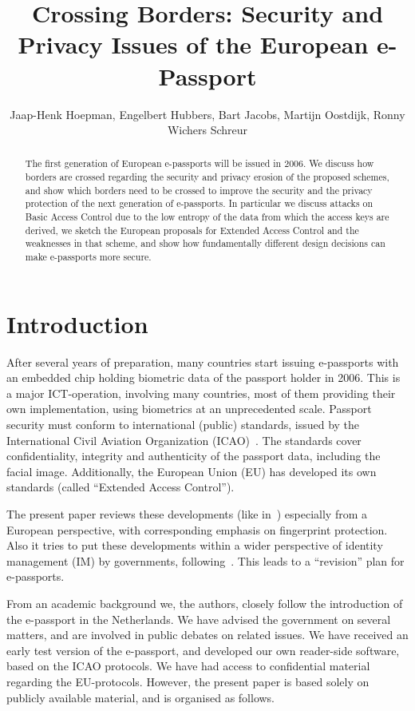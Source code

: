 \documentclass[runningheads,envcountsame,envcountsect,oribibl]{llncs}
\title{Crossing Borders: Security and Privacy Issues of the European 
e-Passport\version{$Id: passport.tex,v 1.44 2006/06/30 07:25:14 ronny Exp $}
}
\author{Jaap-Henk Hoepman,
  Engelbert Hubbers,
  Bart Jacobs,
  Martijn Oostdijk,
  Ronny Wichers Schreur}
\institute{
Institute for Computing and Information Sciences \\
  Radboud University Nijmegen\\
  P.O. Box 9010, 6500 GL \ Nijmegen, 
  the Netherlands \\
  \email{\{jhh,hubbers,bart,martijno,ronny\}@cs.ru.nl}
}
\begin{document}
\maketitle



\begin{abstract}
The first generation of European e-passports will be issued in 2006.  We
discuss how borders are crossed regarding the security and privacy erosion of
the proposed schemes, and show which borders need to be crossed to improve the
security and the privacy protection of the next generation of e-passports.  In
particular we discuss attacks on Basic Access Control due to the low entropy of
the data from which the access keys are derived, we sketch the European
proposals for Extended Access Control and the weaknesses in that scheme, and
show how fundamentally different design decisions can make e-passports
more secure.
\end{abstract}

\section{Introduction} 

After several years of preparation, many countries start
issuing e-pass\-ports with an embedded chip holding biometric data of
the passport holder in 2006. This is a major ICT-operation, involving many
countries, most of them providing their own implementation, using
biometrics at an unprecedented scale. Passport security must
conform to international (public) standards, issued
by the International Civil Aviation Organization
(ICAO)~\cite{icao04:pki,icao04:lds}. The standards cover confidentiality,
integrity and authenticity of the passport data, including the facial
image. Additionally, the European Union (EU) has developed its own
standards (called ``Extended Access Control'').


The present paper reviews these developments (like
in~\cite{juels2005passports,kc2005mrtd}) especially from a European
perspective, with corresponding emphasis on fingerprint protection.
Also it tries to put these developments within a wider perspective of
identity management (IM) by governments,
following~\cite{hoepman2006epassports}. This leads to a ``revision''
plan for e-passports.

From an academic background we, the authors, closely follow the
introduction of the e-passport in the Netherlands.
We have advised
the government on several matters, and are involved in public debates
on related issues. We have received an early test version of
the e-passport, and developed our own reader-side software, based on
the ICAO protocols. We have had access to confidential material
regarding the EU-protocols. However, the present paper is based solely
on publicly available material, and is organised as follows. 
\end{document}

